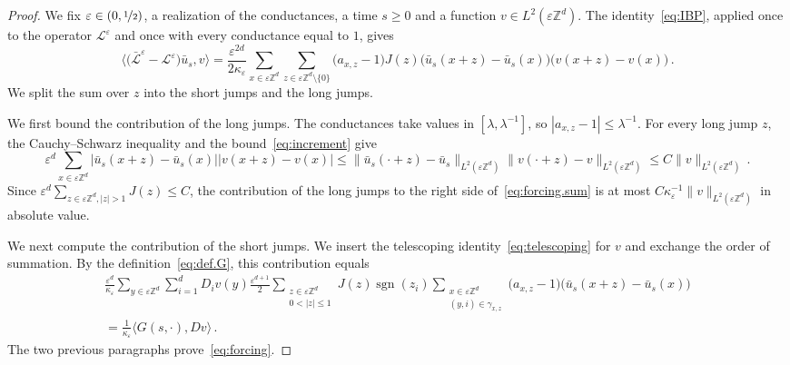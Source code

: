 \documentclass[11pt]{amsart}
\numberwithin{equation}{section}
\newcommand{\Z}{\mathbb{Z}}
\newcommand{\eps}{\varepsilon}
\newcommand{\Leps}{\mathcal{L}^\varepsilon}
\newcommand{\Lbar}{\bar{\mathcal{L}}^\varepsilon}
\newcommand{\sgn}{\operatorname{sgn}}
\newcommand{\nf}{\nicefrac}
\begin{document}
\begin{proof}
We fix $\eps \in (0, \nf12)$, a realization of the conductances, a time $s \geq 0$ and a function $v \in L^2(\eps \Z^d)$.
The identity~\eqref{eq:IBP}, applied once to the operator $\Leps$ and once with every conductance equal to $1$, gives
\begin{equation} \label{eq:forcing.sum}
     \bigl\langle \bigl( \Lbar - \Leps \bigr) \bar u_s, v \bigr\rangle = \frac{\eps^{2d}}{2 \kappa_\eps} \sum_{x \in \eps \Z^d} \sum_{z \in \eps \Z^d \setminus \{0\}} \bigl( a_{x,z} - 1 \bigr) J(z) \bigl( \bar u_s(x + z) - \bar u_s(x) \bigr) \bigl( v(x + z) - v(x) \bigr)\,.
\end{equation}
We split the sum over $z$ into the short jumps and the long jumps.

We first bound the contribution of the long jumps.
The conductances take values in $[\lambda, \lambda^{-1}]$, so $|a_{x,z} - 1| \leq \lambda^{-1}$.
For every long jump $z$, the Cauchy--Schwarz inequality and the bound~\eqref{eq:increment} give
\begin{equation*}
    \eps^d \sum_{x \in \eps \Z^d} \bigl| \bar u_s(x + z) - \bar u_s(x) \bigr| \bigl| v(x + z) - v(x) \bigr| \leq \|\bar u_s(\cdot + z) - \bar u_s\|_{L^2(\eps \Z^d)} \|v(\cdot + z) - v\|_{L^2(\eps \Z^d)} \leq C \|v\|_{L^2(\eps \Z^d)}\,.
\end{equation*}
Since $\eps^d \sum_{z \in \eps \Z^d, |z| > 1} J(z) \leq C$, the contribution of the long jumps to the right side of~\eqref{eq:forcing.sum} is at most $C \kappa_\eps^{-1} \|v\|_{L^2(\eps \Z^d)}$ in absolute value.

We next compute the contribution of the short jumps.
We insert the telescoping identity~\eqref{eq:telescoping} for $v$ and exchange the order of summation.
By the definition~\eqref{eq:def.G}, this contribution equals
\begin{multline*}
    \frac{\eps^d}{\kappa_\eps} \sum_{y \in \eps \Z^d} \sum_{i=1}^d D_i v(y) \frac{\eps^{d+1}}{2} \sum_{\substack{z \in \eps \Z^d \\ 0 < |z| \leq 1}} J(z) \sgn(z_i) \sum_{\substack{x \in \eps \Z^d \\ (y,i) \in \gamma_{x,z}}} \bigl( a_{x,z} - 1 \bigr) \bigl( \bar u_s(x + z) - \bar u_s(x) \bigr) \\
    = \frac{1}{\kappa_\eps} \langle G(s, \cdot), D v \rangle\,.
\end{multline*}
The two previous paragraphs prove~\eqref{eq:forcing}.
\end{proof}
\end{document}
